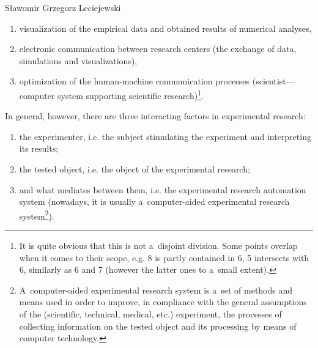 \begin{artengenv}{Sławomir Grzegorz Leciejewski}
\begin{enumerate}
\item visualization of the empirical data and obtained results of numerical analyses,

\item electronic communication between research centers (the exchange of data, simulations and visualizations),

\item optimization of the human-machine communication processes (scientist---computer system supporting scientific research)\footnote{It is quite obvious that this is not a~disjoint division. Some points overlap when it comes to their scope, e.g. 8 is partly contained in 6, 5 intersects with 6, similarly as 6 and 7 (however the latter ones to a~small extent).}.

\end{enumerate}

In general, however, there are three interacting factors in experimental research:



\begin{enumerate}[label=\Alph*.]

\item the experimenter, i.e. the subject stimulating the experiment and interpreting its results;

\item the tested object, i.e. the object of the experimental research;

\item and what mediates between them, i.e. the experimental research automation system (nowadays, it is usually a~computer-aided experimental research system\footnote{A~computer-aided experimental research system is a~set of methods and means used in order to improve, in compliance with the general assumptions of the (scientific, technical, medical, etc.) experiment, the processes of collecting information on the tested object and its processing by means of computer technology. }).

\end{enumerate}


\end{artengenv}
